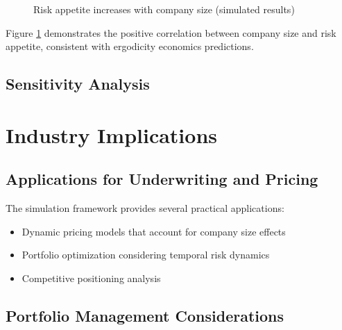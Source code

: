\documentclass[11pt,letterpaper]{article}
\begin{document}
\begin{figure}[H]
\centering
\caption{Risk appetite increases with company size (simulated results)}
\label{fig:appetite_vs_size}
\end{figure}

Figure \ref{fig:appetite_vs_size} demonstrates the positive correlation between company size and risk appetite, consistent with ergodicity economics predictions.

\subsection{Sensitivity Analysis}


\section{Industry Implications}

\subsection{Applications for Underwriting and Pricing}

The simulation framework provides several practical applications:
\begin{itemize}
    \item Dynamic pricing models that account for company size effects
    \item Portfolio optimization considering temporal risk dynamics
    \item Competitive positioning analysis
\end{itemize}

\subsection{Portfolio Management Considerations}
\end{document}
